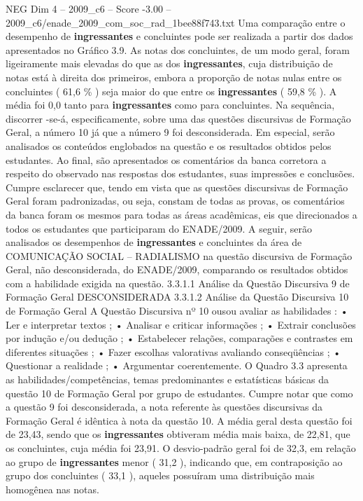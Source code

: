 \begin{textsample}{NEG Dim 4 – 2009\_c6 – Score -3.00 – 2009\_c6/enade\_2009\_com\_soc\_rad\_1bee88f743.txt}
Uma comparação entre o desempenho de \textbf{ingressantes} e concluintes pode ser realizada a partir dos dados apresentados no Gráfico 3.9.
As notas dos concluintes, de um modo geral, foram ligeiramente mais elevadas do que as dos \textbf{ingressantes}, cuja distribuição de notas está à direita dos primeiros, embora a proporção de notas nulas entre os concluintes ( 61,6 \% ) seja maior do que entre os \textbf{ingressantes} ( 59,8 \% ).
A média foi 0,0 tanto para \textbf{ingressantes} como para concluintes.
Na sequência, discorrer -se-á, especificamente, sobre uma das questões discursivas de Formação Geral, a número 10 já que a número 9 foi desconsiderada.
Em especial, serão analisados os conteúdos englobados na questão e os resultados obtidos pelos estudantes.
Ao final, são apresentados os comentários da banca corretora a respeito do observado nas respostas dos estudantes, suas impressões e conclusões.
Cumpre esclarecer que, tendo em vista que as questões discursivas de Formação Geral foram padronizadas, ou seja, constam de todas as provas, os comentários da banca foram os mesmos para todas as áreas acadêmicas, eis que direcionados a todos os estudantes que participaram do ENADE/2009.
A seguir, serão analisados os desempenhos de \textbf{ingressantes} e concluintes da área de COMUNICAÇÃO SOCIAL – RADIALISMO na questão discursiva de Formação Geral, não desconsiderada, do ENADE/2009, comparando os resultados obtidos com a habilidade exigida na questão. 3.3.1.1 Análise da Questão Discursiva 9 de Formação Geral DESCONSIDERADA 3.3.1.2 Análise da Questão Discursiva 10 de Formação Geral A Questão Discursiva nº 10 ousou avaliar as habilidades : • Ler e interpretar textos ; • Analisar e criticar informações ; • Extrair conclusões por indução e/ou dedução ; • Estabelecer relações, comparações e contrastes em diferentes situações ; • Fazer escolhas valorativas avaliando conseqüências ; • Questionar a realidade ; • Argumentar coerentemente.
O Quadro 3.3 apresenta as habilidades/competências, temas predominantes e estatísticas básicas da questão 10 de Formação Geral por grupo de estudantes.
Cumpre notar que como a questão 9 foi desconsiderada, a nota referente às questões discursivas da Formação Geral é idêntica à nota da questão 10.
A média geral desta questão foi de 23,43, sendo que os \textbf{ingressantes} obtiveram média mais baixa, de 22,81, que os concluintes, cuja média foi 23,91.
O desvio-padrão geral foi de 32,3, em relação ao grupo de \textbf{ingressantes} menor ( 31,2 ), indicando que, em contraposição ao grupo dos concluintes ( 33,1 ), aqueles possuíram uma distribuição mais homogênea nas notas.

\end{textsample}
